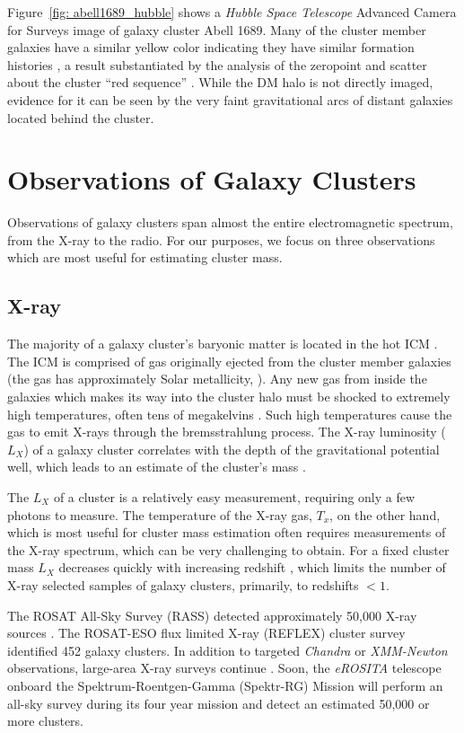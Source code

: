 Figure~\ref{fig: abell1689_hubble} shows a \emph{Hubble Space Telescope} Advanced Camera for Surveys image of galaxy cluster Abell 1689. Many of the cluster member galaxies have a similar yellow color indicating they have similar formation histories , a result substantiated by the analysis of the zeropoint and scatter about the cluster ``red sequence'' . While the DM halo is not directly imaged, evidence for it can be seen by the very faint gravitational arcs of distant galaxies located behind the cluster.

\section{Observations of Galaxy Clusters}
Observations of galaxy clusters span almost the entire electromagnetic spectrum, from the X-ray to the radio. For our purposes, we focus on three observations which are most useful for estimating cluster mass.

\subsection{X-ray}
The majority of a galaxy cluster's baryonic matter is located in the hot ICM \citep{Voit2005}. The ICM is comprised of gas originally ejected from the cluster member galaxies (the gas has approximately Solar metallicity, \citealt{Mushotzky1981}). Any new gas from inside the galaxies which makes its way into the cluster halo must be shocked to extremely high temperatures, often tens of megakelvins . Such high temperatures cause the gas to emit X-rays through the bremsstrahlung process. The X-ray luminosity ($L_X$) of a galaxy cluster correlates with the depth of the gravitational potential well, which leads to an estimate of the cluster's mass . 

The $L_X$ of a cluster is a relatively easy measurement, requiring only a few photons to measure. The temperature of the X-ray gas, $T_x$, on the other hand, which is most useful for cluster mass estimation often requires measurements of the X-ray spectrum, which can be very challenging to obtain. For a fixed cluster mass $L_X$ decreases quickly with increasing redshift , which limits  the number of X-ray selected samples of galaxy clusters, primarily, to redshifts $< 1$. 

The ROSAT All-Sky Survey (RASS) detected approximately 50,000 X-ray sources \citep{Voges1999}. The ROSAT-ESO flux limited X-ray (REFLEX) cluster survey \citep{Bhringer2001} identified 452 galaxy clusters. In addition to targeted \textit{Chandra}  or \textit{XMM-Newton}  observations, large-area X-ray surveys continue . Soon, the \textit{eROSITA} \citep{Pillepich2012} telescope onboard the Spektrum-Roentgen-Gamma (Spektr-RG) Mission will perform an all-sky survey during its four year mission and detect an estimated 50,000 or more clusters.

